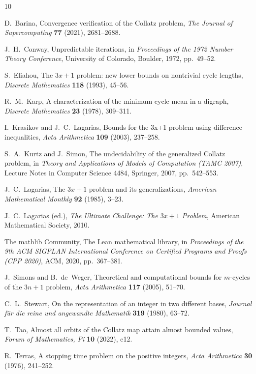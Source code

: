 \documentclass[11pt]{article}
\begin{document}
\begin{thebibliography}{10}

 D.~Barina, Convergence verification of the Collatz
problem, \emph{The Journal of Supercomputing} \textbf{77} (2021),
2681--2688.

 J.~H.~Conway, Unpredictable iterations, in
\emph{Proceedings of the 1972 Number Theory Conference}, University of
Colorado, Boulder, 1972, pp.~49--52.

 S.~Eliahou, The $3x+1$ problem: new lower bounds on
nontrivial cycle lengths, \emph{Discrete Mathematics} \textbf{118}
(1993), 45--56.

 R.~M.~Karp, A characterization of the minimum cycle mean
in a digraph, \emph{Discrete Mathematics} \textbf{23} (1978), 309--311.

 I.~Krasikov and J.~C.~Lagarias, Bounds for
the 3x+1 problem using difference inequalities, \emph{Acta Arithmetica}
\textbf{109} (2003), 237--258.

 S.~A.~Kurtz and J.~Simon, The undecidability of
the generalized Collatz problem, in \emph{Theory and Applications of
Models of Computation (TAMC 2007)}, Lecture Notes in Computer Science
4484, Springer, 2007, pp.~542--553.

 J.~C.~Lagarias, The $3x+1$ problem and its
generalizations, \emph{American Mathematical Monthly} \textbf{92}
(1985), 3--23.

 J.~C.~Lagarias (ed.), \emph{The Ultimate
Challenge: The $3x+1$ Problem}, American Mathematical Society, 2010.

 The mathlib Community, The Lean mathematical library,
in \emph{Proceedings of the 9th ACM SIGPLAN International Conference on
Certified Programs and Proofs (CPP 2020)}, ACM, 2020, pp.~367--381.

 J.~Simons and B.~de~Weger, Theoretical and
computational bounds for $m$-cycles of the $3n+1$ problem, \emph{Acta
Arithmetica} \textbf{117} (2005), 51--70.

 C.~L.~Stewart, On the representation of an integer
in two different bases, \emph{Journal f\"ur die reine und angewandte
Mathematik} \textbf{319} (1980), 63--72.

 T.~Tao, Almost all orbits of the Collatz map attain
almost bounded values, \emph{Forum of Mathematics, Pi} \textbf{10}
(2022), e12.

 R.~Terras, A stopping time problem on the positive
integers, \emph{Acta Arithmetica} \textbf{30} (1976), 241--252.

\end{thebibliography}
\end{document}
